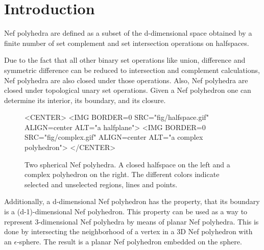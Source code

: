 \ccParDims






\minitoc

\section{Introduction}

Nef polyhedra are defined as a subset of the d-dimensional space obtained by
a finite number of set complement and set intersection operations on
halfspaces. 

Due to the fact that all other binary set operations like union,
difference and symmetric difference can be reduced to intersection and
complement calculations, Nef polyhedra are also closed under those
operations. Also, Nef polyhedra are closed under topological unary 
set operations. Given a Nef polyhedron one can determine its interior, its
boundary, and its closure.

\begin{figure}[htbp]
\begin{ccTexOnly}
\begin{center}
\hspace{1cm}
\end{center}
\end{ccTexOnly}
\caption{Two spherical Nef polyhedra. A closed halfspace on the left 
  and a complex polyhedron on the right. The different colors indicate
  selected and unselected regions, lines and points.}\label{nefsexamples}
\begin{ccHtmlOnly}
<CENTER>
<IMG BORDER=0 SRC="fig/halfspace.gif" ALIGN=center
ALT="a halfplane">
<IMG BORDER=0 SRC="fig/complex.gif" ALIGN=center
ALT="a complex polyhedron">
</CENTER>
\end{ccHtmlOnly}
\end{figure}      

Additionally, a d-dimensional Nef polyhedron has the property, that its boundary
is a (d-1)-dimensional Nef polyhedron. This property can be used as a way to
represent 3-dimensional Nef polyhedra by means of planar Nef polyhedra.
This is done by intersecting the neighborhood of a vertex in a 3D Nef polyhedron
with an $\epsilon$-sphere. The result is a planar Nef polyhedron embedded
on the sphere.

